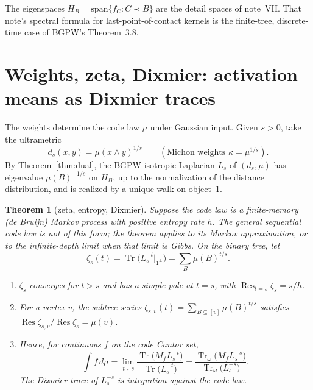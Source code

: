 \documentclass[11pt]{article}
\newtheorem{theorem}{Theorem}[section]
\theoremstyle{definition}
\theoremstyle{remark}
\newcommand{\Tr}{\operatorname{Tr}}
\newcommand{\Res}{\operatorname{Res}}
\begin{document}
The eigenspaces $H_B=\mathrm{span}\{f_C:C\prec B\}$ are the detail spaces of note~VII. That note's spectral formula for last-point-of-contact kernels is the finite-tree, discrete-time case of BGPW's Theorem~3.8.

\section{Weights, zeta, Dixmier: activation means as Dixmier traces}

The weights determine the code law $\mu$ under Gaussian input. Given $s>0$, take the ultrametric
\[d_s(x,y)=\mu(x\wedge y)^{1/s}\qquad(\text{Michon weights }\kappa=\mu^{1/s}).\]
By Theorem~\ref{thm:dual}, the BGPW isotropic Laplacian $L_s$ of $(d_s,\mu)$ has eigenvalue $\mu(B)^{-1/s}$ on $H_B$, up to the normalization of the distance distribution, and is realized by a unique walk on object~1.

\begin{theorem}[zeta, entropy, Dixmier]\label{thm:zeta}
Suppose the code law is a finite-memory (de Bruijn) Markov process with positive entropy rate $h$. The general sequential code law is not of this form; the theorem applies to its Markov approximation, or to the infinite-depth limit when that limit is Gibbs. On the binary tree, let
\[\zeta_s(t)=\Tr\big(L_s^{-t}\big|_{1^\perp}\big)=\sum_B\mu(B)^{t/s}.\]
\begin{enumerate}
\item[(i)] $\zeta_s$ converges for $t>s$ and has a simple pole at $t=s$, with $\Res_{t=s}\zeta_s=s/h$.
\item[(ii)] For a vertex $v$, the subtree series $\zeta_{s,v}(t)=\sum_{B\subseteq[v]}\mu(B)^{t/s}$ satisfies $\Res\zeta_{s,v}/\Res\zeta_s=\mu(v)$.
\item[(iii)] Hence, for continuous $f$ on the code Cantor set,
\[\int f\,d\mu=\lim_{t\downarrow s}\frac{\Tr\big(M_fL_s^{-t}\big)}{\Tr\big(L_s^{-t}\big)}=\frac{\Tr_\omega\big(M_fL_s^{-s}\big)}{\Tr_\omega\big(L_s^{-s}\big)}.\]
The Dixmier trace of $L_s^{-s}$ is integration against the code law.
\end{enumerate}
\end{theorem}
\end{document}
